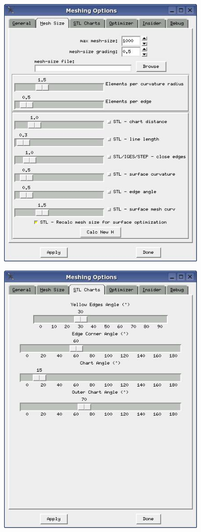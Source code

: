 \documentclass[12pt]{book}
\begin{document}
\includegraphics[width=10cm]{pictures/meshingoptions_2} 

\includegraphics[width=10cm]{pictures/meshingoptions_3} 
\end{document}
